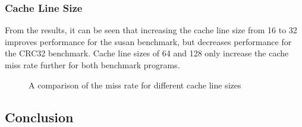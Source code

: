 \subsubsection{Cache Line Size}

From the results, it can be seen that increasing the cache line size from 16 to 32 
improves performance for the susan benchmark, but decreases performance for the CRC32 
benchmark. Cache line sizes of 64 and 128 only increase the cache miss rate further for 
both benchmark programs.

\begin{figure}
    \centering
    
    \caption{A comparison of the miss rate for different cache line sizes}
    \label{fig:partb-cacheln}
\end{figure}


\subsection{Conclusion}